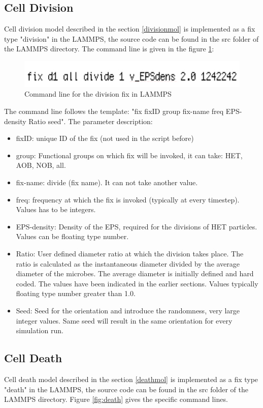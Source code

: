 \documentclass[11pt,a4paper,openright]{article}
\begin{document}
\subsection{Cell Division}
Cell division model described in the section \ref{divisionmol} is implemented as a fix type "division" in the LAMMPS, the source code can be found in the src folder of the LAMMPS directory. The command line is given in the figure \ref{fig:division}:

\begin{figure}[H]
\begin{center}
  \includegraphics[width=0.6\columnwidth]{Figs/divisionfix.pdf}
\caption{Command line for the division fix in LAMMPS}
\label{fig:division}       %
\end{center}
\end{figure}

The command line follows the template: "fix fixID group fix-name freq EPS-density Ratio seed". The parameter description:
\begin{itemize}
\item fixID: unique ID of the fix (not used in the script before)
\item group: Functional groups on which fix will be invoked, it can take: HET, AOB, NOB, all.
\item fix-name: divide (fix name). It can not take another value.
\item freq: frequency at which the fix is invoked (typically at every timestep). Values has to be integers.
\item EPS-density: Density of the EPS, required for the divisions of HET particles. Values can be floating type number.
\item Ratio: User defined diameter ratio at which the division takes place. The ratio is calculated as the instantaneous diameter divided by the average diameter of the microbes. The average diameter is initially defined and hard coded. The values have been indicated in the earlier sections. Values typically floating type number greater than 1.0.
\item Seed: Seed for the orientation and introduce the randomness, very large integer values. Same seed will result in the same orientation for every simulation run. 
\end{itemize}

\subsection{Cell Death}
Cell death model described in the section \ref{deathmol} is implemented as a fix type "death" in the LAMMPS, the source code can be found in the src folder of the LAMMPS directory. Figure \ref{fig:death} gives the specific command lines.
\end{document}
